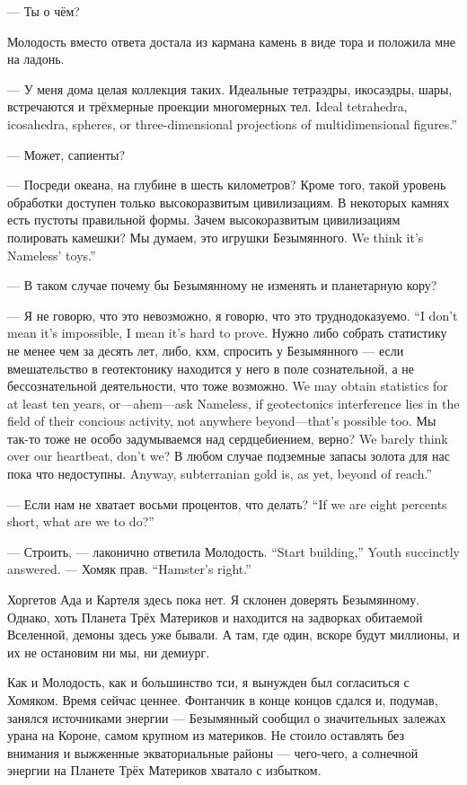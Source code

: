 --- Ты о чём?

Молодость вместо ответа достала из кармана камень в виде тора и положила мне на ладонь.

--- У меня дома целая коллекция таких.
{Идеальные тетраэдры, икосаэдры, шары, встречаются и трёхмерные проекции многомерных тел.}
{Ideal tetrahedra, icosahedra, spheres, or three-dimensional projections of multidimensional figures.''}

--- Может, сапиенты?

--- Посреди океана, на глубине в шесть километров?
Кроме того, такой уровень обработки доступен только высокоразвитым цивилизациям.
В некоторых камнях есть пустоты правильной формы.
Зачем высокоразвитым цивилизациям полировать камешки?
{Мы думаем, это игрушки Безымянного.}
{We think it's Nameless' toys.''}

--- В таком случае почему бы Безымянному не изменять и планетарную кору?

{--- Я не говорю, что это невозможно, я говорю, что это труднодоказуемо.}
{``I don't mean it's impossible, I mean it's hard to prove.}
{Нужно либо собрать статистику не менее чем за десять лет, либо, кхм, спросить у Безымянного --- если вмешательство в геотектонику находится у него в поле сознательной, а не бессознательной деятельности, что тоже возможно.}
{We may obtain statistics for at least ten years, or---ahem---ask Nameless, if geotectonics interference lies in the field of their concious activity, not anywhere beyond---that's possible too.}
{Мы так-то тоже не особо задумываемся над сердцебиением, верно?}
{We barely think over our heartbeat, don't we?}
{В любом случае подземные запасы золота для нас пока что недоступны.}
{Anyway, subterranian gold is, as yet, beyond of reach.''}

{--- Если нам не хватает восьми процентов, что делать?}
{``If we are eight percents short, what are we to do?''}

{--- Строить, --- лаконично ответила Молодость.}
{``Start building,'' Youth succinctly answered.}
{--- Хомяк прав.}
{``Hamster's right.''}

Хоргетов Ада и Картеля здесь пока нет.
Я склонен доверять Безымянному.
Однако, хоть Планета Трёх Материков и находится на задворках обитаемой Вселенной, демоны здесь уже бывали.
А там, где один, вскоре будут миллионы, и их не остановим ни мы, ни демиург.

Как и Молодость, как и большинство тси, я вынужден был согласиться с Хомяком.
Время сейчас ценнее.
Фонтанчик в конце концов сдался и, подумав, занялся источниками энергии --- Безымянный сообщил о значительных залежах урана на Короне, самом крупном из материков.
Не стоило оставлять без внимания и выжженные экваториальные районы --- чего-чего, а солнечной энергии на Планете Трёх Материков хватало с избытком.

